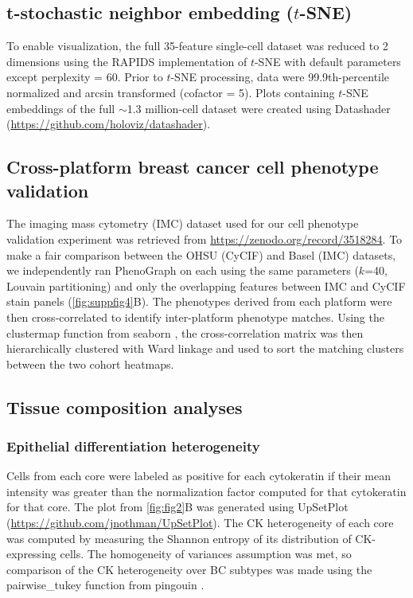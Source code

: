 \documentclass[preprint,review,3p,12pt]{elsarticle}
\begin{document}
\subsection{t-stochastic neighbor embedding ($t$-SNE)}
To enable visualization, the full 35-feature single-cell dataset was reduced to 2 dimensions using the RAPIDS implementation of $t$-SNE \cite{tsne2008} with default parameters except perplexity = 60. Prior to $t$-SNE processing, data were 99.9th-percentile normalized and arcsin transformed (cofactor = 5). Plots containing $t$-SNE embeddings of the full $\sim$1.3 million-cell dataset were created using Datashader (\url{https://github.com/holoviz/datashader}).

\subsection{Cross-platform breast cancer cell phenotype validation}
The imaging mass cytometry (IMC) dataset \cite{jackson_single-cell_2020} used for our cell phenotype validation experiment was retrieved from \url{https://zenodo.org/record/3518284}. To make a fair comparison between the OHSU (CyCIF) and Basel (IMC) datasets, we independently ran PhenoGraph on each using the same parameters ($k$=40, Louvain partitioning) and only the overlapping features between IMC and CyCIF stain panels (\autoref{fig:suppfig4}B). The phenotypes derived from each platform were then cross-correlated to identify inter-platform phenotype matches. Using the clustermap function from seaborn \cite{seaborn2020}, the cross-correlation matrix was then hierarchically clustered with Ward linkage and used to sort the matching clusters between the two cohort heatmaps.

\subsection{Tissue composition analyses}
\subsubsection{Epithelial differentiation heterogeneity}
Cells from each core were labeled as positive for each cytokeratin if their mean intensity was greater than the normalization factor computed for that cytokeratin for that core. The plot from \autoref{fig:fig2}B was generated using UpSetPlot (\url{https://github.com/jnothman/UpSetPlot}). The CK heterogeneity of each core was computed by measuring the Shannon entropy of its distribution of CK-expressing cells. The homogeneity of variances assumption was met, so comparison of the CK heterogeneity over BC subtypes was made using the pairwise\_tukey function from pingouin \cite{pingouin2018}.
\end{document}
